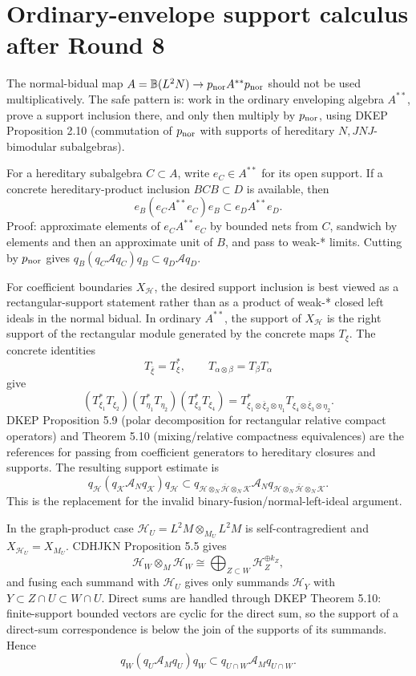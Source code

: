 \documentclass{article}
\begin{document}
\section*{Ordinary-envelope support calculus after Round 8}

The normal-bidual map \(A=\mathbb B(L^2N)\to p_{\rm nor}A^{**}p_{\rm nor}\)
should not be used multiplicatively.  The safe pattern is:
work in the ordinary enveloping algebra \(A^{**}\), prove a support inclusion
there, and only then multiply by \(p_{\rm nor}\), using DKEP Proposition 2.10
(commutation of \(p_{\rm nor}\) with supports of hereditary \(N,JNJ\)-bimodular
subalgebras).

For a hereditary subalgebra \(C\subset A\), write \(e_C\in A^{**}\) for its open
support.  If a concrete hereditary-product inclusion \(B C B\subset D\) is
available, then
\[
  e_B(e_C A^{**}e_C)e_B\subset e_D A^{**}e_D.
\]
Proof: approximate elements of \(e_C A^{**}e_C\) by bounded nets from \(C\),
sandwich by elements and then an approximate unit of \(B\), and pass to weak-*
limits.  Cutting by \(p_{\rm nor}\) gives
\(q_B(q_C\mathcal A q_C)q_B\subset q_D\mathcal A q_D\).

For coefficient boundaries \(X_{\mathcal H}\), the desired support inclusion is
best viewed as a rectangular-support statement rather than as a product of
weak-* closed left ideals in the normal bidual.  In ordinary \(A^{**}\), the
support of \(X_{\mathcal H}\) is the right support of the rectangular module
generated by the concrete maps \(T_\xi\).  The concrete identities
\[
  T_{\bar\xi}=T_\xi^*,\qquad T_{\alpha\otimes\beta}=T_\beta T_\alpha
\]
give
\[
 (T_{\xi_1}^*T_{\xi_2})(T_{\eta_1}^*T_{\eta_2})
 (T_{\xi_3}^*T_{\xi_4})
 =
 T_{\xi_1\otimes\bar\xi_2\otimes\eta_1}^*
 T_{\xi_4\otimes\bar\xi_3\otimes\eta_2}.
\]
DKEP Proposition 5.9 (polar decomposition for rectangular relative compact
operators) and Theorem 5.10 (mixing/relative compactness equivalences) are the
references for passing from coefficient generators to hereditary closures and
supports.  The resulting support estimate is
\[
  q_{\mathcal H}(q_{\mathcal K}\mathcal A_N q_{\mathcal K})q_{\mathcal H}
  \subset
  q_{\mathcal H\otimes_N\bar{\mathcal H}\otimes_N\mathcal K}
  \mathcal A_N
  q_{\mathcal H\otimes_N\bar{\mathcal H}\otimes_N\mathcal K}.
\]
This is the replacement for the invalid binary-fusion/normal-left-ideal
argument.

In the graph-product case
\(\mathcal H_U=L^2M\otimes_{M_U}L^2M\) is self-contragredient and
\(X_{\mathcal H_U}=X_{M_U}\).  CDHJKN Proposition 5.5 gives
\[
  \mathcal H_W\otimes_M\mathcal H_W
  \cong \bigoplus_{Z\subset W}\mathcal H_Z^{\oplus k_Z},
\]
and fusing each summand with \(\mathcal H_U\) gives only summands
\(\mathcal H_Y\) with \(Y\subset Z\cap U\subset W\cap U\).  Direct sums are
handled through DKEP Theorem 5.10: finite-support bounded vectors are cyclic for
the direct sum, so the support of a direct-sum correspondence is below the join
of the supports of its summands.  Hence
\[
  q_W(q_U\mathcal A_Mq_U)q_W
  \subset q_{U\cap W}\mathcal A_Mq_{U\cap W}.
\]
\end{document}
